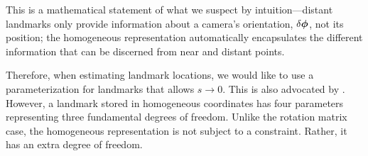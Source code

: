 \documentclass[11pt,a4,oneside]{article}
\begin{document}
This is a mathematical statement of what we suspect by intuition---distant landmarks only provide information about a camera's orientation, ${\delta {\boldsymbol{\phi}}}$, not its position; %
the homogeneous representation automatically encapsulates the different information that can be discerned from near and distant points.

Therefore, when estimating landmark locations, we would like to use a parameterization for landmarks that allows $s \rightarrow 0$. This is also advocated by \citet{Triggs0000}. However, a landmark stored in homogeneous coordinates has four parameters representing three fundamental degrees of freedom. Unlike the rotation matrix case, the homogeneous representation is not subject to a constraint. Rather, it has an extra degree of freedom. 
\end{document}

